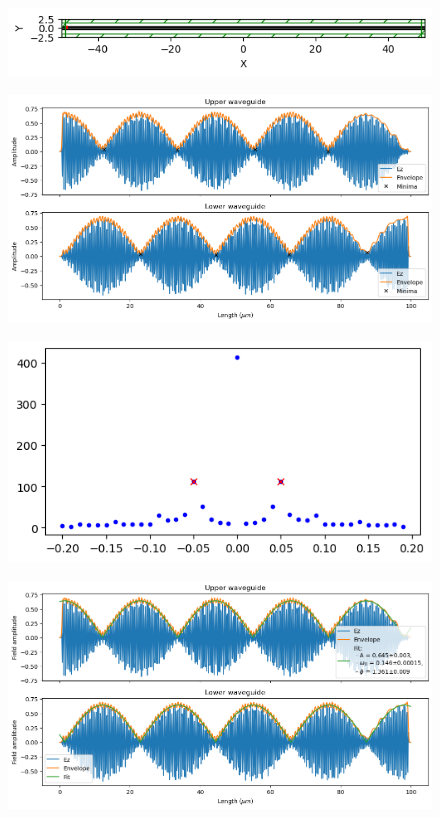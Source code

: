 \begin{figure}[H]
    \centering
    \includegraphics[width=0.8\linewidth]{Figures/wg_design.png}
    \caption{}
    \label{fig:wg_design}
\end{figure}

\begin{figure}[H]
    \centering
    \includegraphics[width=0.8\linewidth]{Figures/wg_field.png}
    \caption{}
    \label{fig:wg_field}
\end{figure}

\begin{figure}[H]
    \centering
    \includegraphics[width=0.5\linewidth]{Figures/wg_fft.png}
    \caption{}
    \label{fig:wg_fft}
\end{figure}

\begin{figure}[H]
    \centering
    \includegraphics[width=0.8\linewidth]{Figures/wg_field_fit.png}
    \caption{}
    \label{fig:wg_field_fit}
\end{figure}

